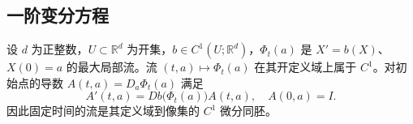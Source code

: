 \subsection{一阶变分方程}
\label{b2:subsec:ode-first-variation}

\begin{theorem}\label{b2:thm:07-flow-derivative}
设 \(d\) 为正整数，\(U\subset\mathbb R^d\) 为开集，\(b\in C^1(U;\mathbb R^d)\)，\(\Phi_t(a)\) 是 \(X'=b(X)\)、\(X(0)=a\) 的最大局部流。流 \((t,a)\mapsto\Phi_t(a)\) 在其开定义域上属于 \(C^1\)。对初始点的导数 \(A(t,a)=D_a\Phi_t(a)\) 满足
\begin{equation}\label{b2:eq:07-variational-ode}
 A'(t,a)=Db\bigl(\Phi_t(a)\bigr)A(t,a),\quad A(0,a)=I.
\end{equation}
因此固定时间的流是其定义域到像集的 \(C^1\) 微分同胚。
\end{theorem}
